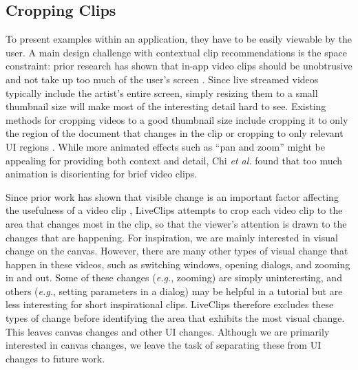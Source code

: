 \subsection{Cropping Clips}
To present examples within an application, they have to be easily viewable by the user. A main design challenge with contextual clip recommendations is the space constraint: prior research has shown that in-app video clips should be unobtrusive and not take up too much of the user's screen \cite{Grossman2010a}. Since live streamed videos typically include the artist's entire screen, simply resizing them to a small thumbnail size will make most of the interesting detail hard to see. Existing methods for cropping videos to a good thumbnail size include cropping it to only the region of the document that changes in the clip \cite{Grossman2010} or cropping to only relevant UI regions \cite{Chi2012}. While more animated effects such as ``pan and zoom'' might be appealing for providing both context and detail, Chi \textit{et al.} \cite{Chi2012} found that too much animation is disorienting for brief video clips.

Since prior work has shown that visible change is an important factor affecting the usefulness of a video clip \cite{Lafreniere2014}, LiveClips attempts to crop each video clip to the area that changes most in the clip, so that the viewer's attention is drawn to the changes that are happening. For inspiration, we are mainly interested in visual change on the canvas. However, there are many other types of visual change that happen in these videos, such as switching windows, opening dialogs, and zooming in and out. Some of these changes (\textit{e.g.}, zooming) are simply uninteresting, and others (\textit{e.g.}, setting parameters in a dialog) may be helpful in a tutorial but are less interesting for short inspirational clips. 
%
LiveClips therefore excludes these types of change before identifying the area that exhibits the most visual change. This leaves canvas changes and other UI changes. Although we are primarily interested in canvas changes, we leave the task of separating these from UI changes to future work.

